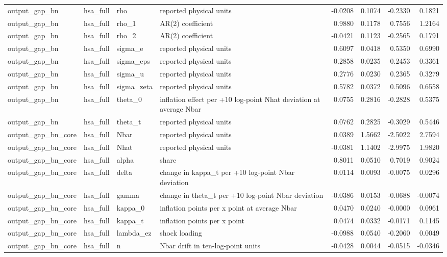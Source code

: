 \begin{tabular}{llllrrrr}
output\_gap\_bn & hsa\_full & rho & reported physical units & -0.0208 & 0.1074 & -0.2330 & 0.1821 \\
output\_gap\_bn & hsa\_full & rho\_1 & AR(2) coefficient & 0.9880 & 0.1178 & 0.7556 & 1.2164 \\
output\_gap\_bn & hsa\_full & rho\_2 & AR(2) coefficient & -0.0421 & 0.1123 & -0.2565 & 0.1791 \\
output\_gap\_bn & hsa\_full & sigma\_e & reported physical units & 0.6097 & 0.0418 & 0.5350 & 0.6990 \\
output\_gap\_bn & hsa\_full & sigma\_eps & reported physical units & 0.2858 & 0.0235 & 0.2453 & 0.3361 \\
output\_gap\_bn & hsa\_full & sigma\_u & reported physical units & 0.2776 & 0.0230 & 0.2365 & 0.3279 \\
output\_gap\_bn & hsa\_full & sigma\_zeta & reported physical units & 0.5782 & 0.0372 & 0.5096 & 0.6558 \\
output\_gap\_bn & hsa\_full & theta\_0 & inflation effect per +10 log-point Nhat deviation at average Nbar & 0.0755 & 0.2816 & -0.2828 & 0.5375 \\
output\_gap\_bn & hsa\_full & theta\_t & reported physical units & 0.0762 & 0.2825 & -0.3029 & 0.5446 \\
output\_gap\_bn\_core & hsa\_full & Nbar & reported physical units & 0.0389 & 1.5662 & -2.5022 & 2.7594 \\
output\_gap\_bn\_core & hsa\_full & Nhat & reported physical units & -0.0381 & 1.1402 & -2.9975 & 1.9820 \\
output\_gap\_bn\_core & hsa\_full & alpha & share & 0.8011 & 0.0510 & 0.7019 & 0.9024 \\
output\_gap\_bn\_core & hsa\_full & delta & change in kappa\_t per +10 log-point Nbar deviation & 0.0114 & 0.0093 & -0.0075 & 0.0296 \\
output\_gap\_bn\_core & hsa\_full & gamma & change in theta\_t per +10 log-point Nbar deviation & -0.0386 & 0.0153 & -0.0688 & -0.0074 \\
output\_gap\_bn\_core & hsa\_full & kappa\_0 & inflation points per x point at average Nbar & 0.0470 & 0.0240 & -0.0000 & 0.0961 \\
output\_gap\_bn\_core & hsa\_full & kappa\_t & inflation points per x point & 0.0474 & 0.0332 & -0.0171 & 0.1145 \\
output\_gap\_bn\_core & hsa\_full & lambda\_ez & shock loading & -0.0988 & 0.0540 & -0.2060 & 0.0049 \\
output\_gap\_bn\_core & hsa\_full & n & Nbar drift in ten-log-point units & -0.0428 & 0.0044 & -0.0515 & -0.0346 \\

\end{tabular}
